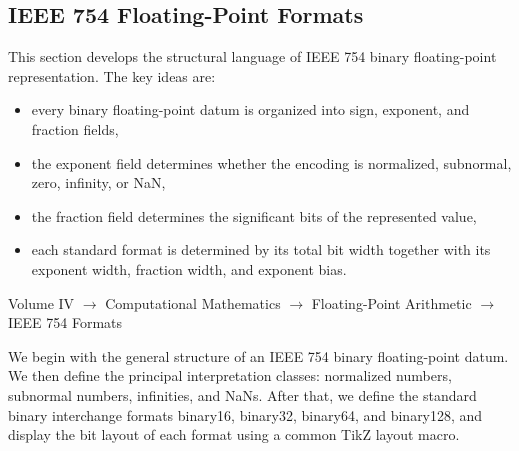 
\subsection{IEEE 754 Floating-Point Formats}

\begin{tcolorbox}[colback=gray!8!white,colframe=gray!50!black,title={Toolkit --- Floating-Point Representation}]
This section develops the structural language of IEEE 754 binary floating-point
representation. The key ideas are:

\begin{itemize}
    \item every binary floating-point datum is organized into sign, exponent, and fraction fields,
    \item the exponent field determines whether the encoding is normalized, subnormal, zero, infinity, or NaN,
    \item the fraction field determines the significant bits of the represented value,
    \item each standard format is determined by its total bit width together with its exponent width, fraction width, and exponent bias.
\end{itemize}
\end{tcolorbox}

\begin{tcolorbox}[colback=gray!5!white,colframe=gray!50!black,title={Breadcrumb}]
Volume IV $\to$ Computational Mathematics $\to$ Floating-Point Arithmetic $\to$ IEEE 754 Formats
\end{tcolorbox}

\begin{remark*}
We begin with the general structure of an IEEE 754 binary floating-point datum.
We then define the principal interpretation classes: normalized numbers, subnormal
numbers, infinities, and NaNs. After that, we define the standard binary interchange
formats binary16, binary32, binary64, and binary128, and display the bit layout of
each format using a common TikZ layout macro.
\end{remark*}


